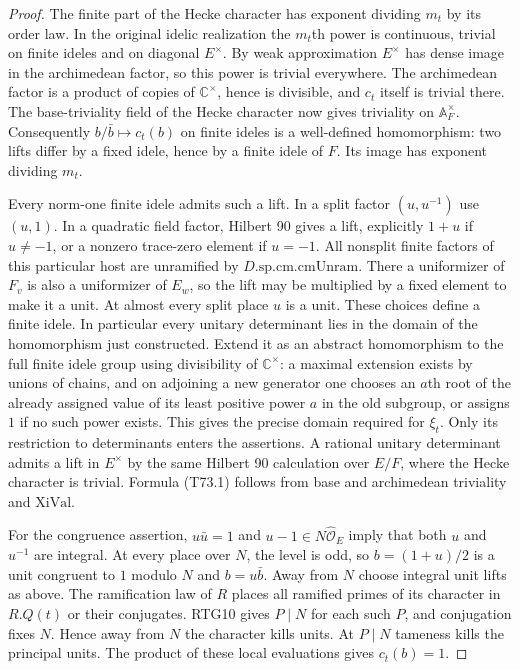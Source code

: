 \begin{proof}
The finite part of the Hecke character has exponent dividing $m_t$
by its order law. In the original idelic realization the $m_t$th power
is continuous, trivial on finite ideles and on diagonal $E^\times$.
By weak approximation $E^\times$ has dense image in the archimedean
factor, so this power is trivial everywhere. The archimedean factor
is a product of copies of $\mathbb C^\times$, hence is divisible,
and $c_t$ itself is trivial there. The base-triviality field of the
Hecke character now gives triviality on $\mathbb A_F^\times$.
Consequently $b/\bar b\mapsto c_t(b)$ on finite ideles is a
well-defined homomorphism: two lifts differ by a fixed idele, hence
by a finite idele of $F$. Its image has exponent dividing $m_t$.

Every norm-one finite idele admits such a lift. In a split factor
$(u,u^{-1})$ use $(u,1)$. In a quadratic field factor, Hilbert 90
gives a lift, explicitly $1+u$ if $u\ne-1$, or a nonzero trace-zero
element if $u=-1$. All nonsplit finite factors of this particular
host are unramified by $D.\mathrm{sp}.\mathrm{cm}.\mathrm{cmUnram}$.
There a uniformizer of $F_v$ is also a uniformizer of $E_w$, so the
lift may be multiplied by a fixed element to make it a unit. At
almost every split place $u$ is a unit. These choices define a finite
idele. In particular every unitary determinant lies in the domain
of the homomorphism just constructed. Extend it as an abstract
homomorphism to the full finite idele group using divisibility of
$\mathbb C^\times$: a maximal extension exists by unions of chains,
and on adjoining a new generator one chooses an $a$th root of the
already assigned value of its least positive power $a$ in the old
subgroup, or assigns $1$ if no such power exists. This gives the
precise domain required for $\xi_t$. Only its restriction to
determinants enters the assertions. A rational unitary determinant
admits a lift in $E^\times$ by the same Hilbert 90 calculation over
$E/F$, where the Hecke character is trivial. Formula (T73.1) follows
from base and archimedean triviality and $\mathrm{XiVal}$.

For the congruence assertion, $u\bar u=1$ and
$u-1\in N\widehat{\mathcal O}_E$ imply that both $u$ and $u^{-1}$
are integral. At every place over $N$, the level is odd, so
$b=(1+u)/2$ is a unit congruent to $1$ modulo $N$ and
$b=u\bar b$. Away from $N$ choose integral unit lifts as above.
The ramification law of $R$ places all ramified primes of its
character in $R.Q(t)$ or their conjugates. RTG10 gives $P\mid N$
for each such $P$, and conjugation fixes $N$. Hence away from $N$
the character kills units. At $P\mid N$ tameness kills the principal
units. The product of these local evaluations gives $c_t(b)=1$.
\end{proof}

